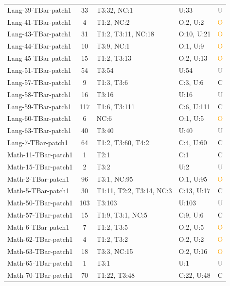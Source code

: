 \begin{longtable}{l|c|l|l|c}
Lang-39-TBar-patch1 & 33 & T3:32, NC:1 & U:33 & \textcolor{gray}{U} \\
Lang-41-TBar-patch1 & 4 & T1:2, NC:2 & O:2, U:2 & \textcolor{orange}{O} \\
Lang-43-TBar-patch1 & 31 & T1:2, T3:11, NC:18 & O:10, U:21 & \textcolor{orange}{O} \\
Lang-44-TBar-patch1 & 10 & T3:9, NC:1 & O:1, U:9 & \textcolor{orange}{O} \\
Lang-45-TBar-patch1 & 15 & T1:2, T3:13 & O:2, U:13 & \textcolor{orange}{O} \\
Lang-51-TBar-patch1 & 54 & T3:54 & U:54 & \textcolor{gray}{U} \\
Lang-57-TBar-patch1 & 9 & T1:3, T3:6 & C:3, U:6 & \textcolor{green!60!black}{C} \\
Lang-58-TBar-patch1 & 16 & T3:16 & U:16 & \textcolor{gray}{U} \\
Lang-59-TBar-patch1 & 117 & T1:6, T3:111 & C:6, U:111 & \textcolor{green!60!black}{C} \\
Lang-60-TBar-patch1 & 6 & NC:6 & O:1, U:5 & \textcolor{orange}{O} \\
Lang-63-TBar-patch1 & 40 & T3:40 & U:40 & \textcolor{gray}{U} \\
Lang-7-TBar-patch1 & 64 & T1:2, T3:60, T4:2 & C:4, U:60 & \textcolor{green!60!black}{C} \\
Math-11-TBar-patch1 & 1 & T2:1 & C:1 & \textcolor{green!60!black}{C} \\
Math-15-TBar-patch1 & 2 & T3:2 & U:2 & \textcolor{gray}{U} \\
Math-2-TBar-patch1 & 96 & T3:1, NC:95 & O:1, U:95 & \textcolor{orange}{O} \\
Math-5-TBar-patch1 & 30 & T1:11, T2:2, T3:14, NC:3 & C:13, U:17 & \textcolor{green!60!black}{C} \\
Math-50-TBar-patch1 & 103 & T3:103 & U:103 & \textcolor{gray}{U} \\
Math-57-TBar-patch1 & 15 & T1:9, T3:1, NC:5 & C:9, U:6 & \textcolor{green!60!black}{C} \\
Math-6-TBar-patch1 & 7 & T1:2, T3:5 & O:2, U:5 & \textcolor{orange}{O} \\
Math-62-TBar-patch1 & 4 & T1:2, T3:2 & O:2, U:2 & \textcolor{orange}{O} \\
Math-63-TBar-patch1 & 18 & T3:3, NC:15 & O:2, U:16 & \textcolor{orange}{O} \\
Math-65-TBar-patch1 & 1 & T3:1 & U:1 & \textcolor{gray}{U} \\
Math-70-TBar-patch1 & 70 & T1:22, T3:48 & C:22, U:48 & \textcolor{green!60!black}{C} \\

\end{longtable}
